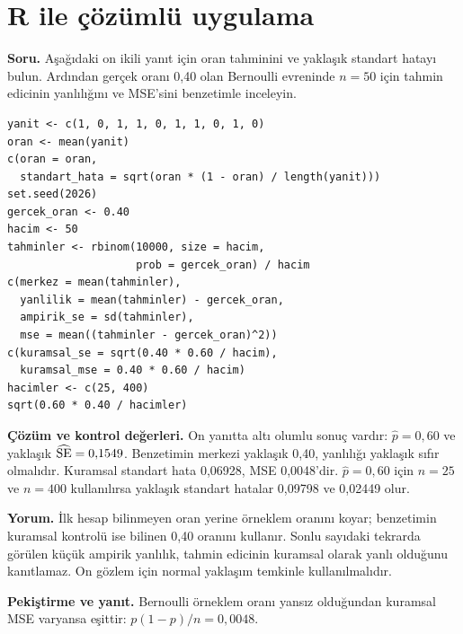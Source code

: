 \section{R ile çözümlü uygulama}
\label{sec:r-b07}

\textbf{Soru.} Aşağıdaki on ikili yanıt için oran tahminini ve yaklaşık
standart hatayı bulun. Ardından gerçek oranı 0,40 olan Bernoulli evreninde
$n=50$ için tahmin edicinin yanlılığını ve MSE'sini benzetimle inceleyin.

\begin{lstlisting}[style=prismR]
yanit <- c(1, 0, 1, 1, 0, 1, 1, 0, 1, 0)
oran <- mean(yanit)
c(oran = oran,
  standart_hata = sqrt(oran * (1 - oran) / length(yanit)))
set.seed(2026)
gercek_oran <- 0.40
hacim <- 50
tahminler <- rbinom(10000, size = hacim,
                    prob = gercek_oran) / hacim
c(merkez = mean(tahminler),
  yanlilik = mean(tahminler) - gercek_oran,
  ampirik_se = sd(tahminler),
  mse = mean((tahminler - gercek_oran)^2))
c(kuramsal_se = sqrt(0.40 * 0.60 / hacim),
  kuramsal_mse = 0.40 * 0.60 / hacim)
hacimler <- c(25, 400)
sqrt(0.60 * 0.40 / hacimler)
\end{lstlisting}

\begin{outputguidebox}
\textbf{Çözüm ve kontrol değerleri.} On yanıtta altı olumlu sonuç vardır:
$\hat p=0{,}60$ ve yaklaşık $\widehat{\operatorname{SE}}=0{,}1549$.
Benzetimin merkezi yaklaşık 0,40, yanlılığı yaklaşık sıfır olmalıdır.
Kuramsal standart hata 0,06928, MSE 0,0048'dir. $\hat p=0{,}60$ için
$n=25$ ve $n=400$ kullanılırsa yaklaşık standart hatalar 0,09798 ve 0,02449 olur.
\end{outputguidebox}

\textbf{Yorum.} İlk hesap bilinmeyen oran yerine örneklem oranını koyar;
benzetimin kuramsal kontrolü ise bilinen 0,40 oranını kullanır. Sonlu sayıdaki
tekrarda görülen küçük ampirik yanlılık, tahmin edicinin kuramsal olarak
yanlı olduğunu kanıtlamaz. On gözlem için normal yaklaşım temkinle kullanılmalıdır.

\textbf{Pekiştirme ve yanıt.} Bernoulli örneklem oranı yansız olduğundan
kuramsal MSE varyansa eşittir: $p(1-p)/n=0{,}0048$.